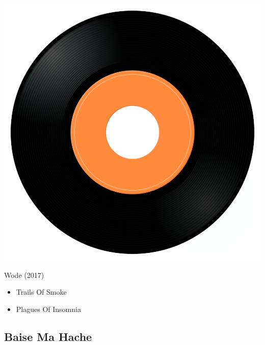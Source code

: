 \begin{minipage}[t]{0.25\textwidth}
\captionsetup{type=figure}
\includegraphics[width=\textwidth]{Images/cover.png}
\caption*{Wode (2017)}
\end{minipage}
\begin{minipage}[t]{0.25\textwidth}\vspace{0pt}
\begin{itemize}[nosep,leftmargin=1em,labelwidth=*,align=left]
	\setlength{\itemsep}{0pt}
	\item Trails Of Smoke
	\item Plagues Of Insomnia
\end{itemize}
\end{minipage}

\subsection{Baise Ma Hache}

